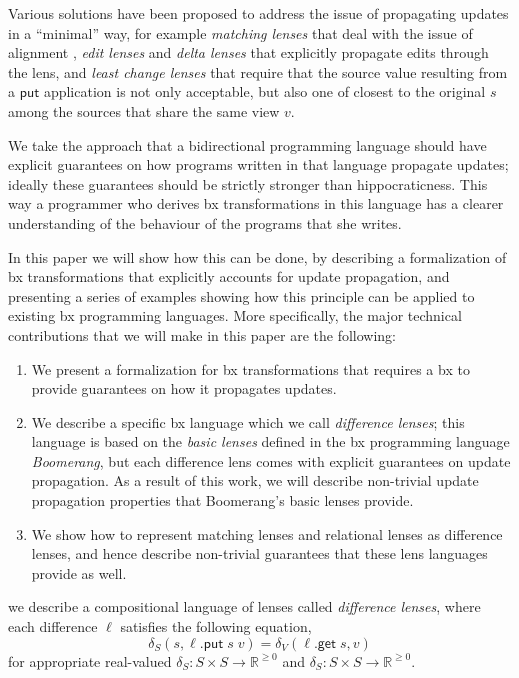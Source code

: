 \documentclass[acmsmall,review,anonymous]{acmart}\settopmatter{printfolios=true,printccs=false,printacmref=false}
\theoremstyle{definition}
\newcommand{\kw}[1]{\ensuremath{\mathsf{#1}}\xspace}
\newcommand{\get}{\ensuremath{\kw{get}}\xspace}
\newcommand{\pput}{\ensuremath{\kw{put}}\xspace}
\begin{document}
Various solutions have been proposed to address the issue of propagating updates in a ``minimal'' way, for example {\em matching lenses} that deal with the issue of alignment \cite{barbosa2010matching}, {\em edit lenses} \cite{hofmann2012edit} and {\em delta lenses} \cite{diskin2011asymmetric,diskin2011state,pacheco2012delta}
that explicitly propagate edits through the lens, and {\em least change
lenses} \cite{macedo2013composing} that require that the source value resulting from a \pput application is not only acceptable, but also one of closest to the original $s$ among the sources that share the same view $v$.

We take the approach that a bidirectional programming language should have explicit guarantees on how programs written in that language propagate updates; ideally these guarantees should be strictly stronger than hippocraticness. This way a programmer who derives bx transformations in this language has a clearer understanding of the behaviour of the programs that she writes. 

In this paper we will show how this can be done, by describing a formalization of bx transformations that explicitly accounts for update propagation, and presenting a series of examples showing how this principle can be applied to existing bx programming languages. More specifically, the major technical contributions that we will make in this paper are the following:
\begin{enumerate}
\item
We present a formalization for bx transformations that requires a bx to provide guarantees on how it propagates updates. 
\item
We describe a specific bx language which we call {\em difference lenses}; this language is based on the {\em basic lenses} defined in the bx programming language {\em Boomerang}\cite{foster2009bidirectional}, but each difference lens comes with explicit guarantees on update propagation. As a result of this work, we will describe non-trivial update propagation properties that Boomerang's basic lenses provide.
  \item
  We show how to represent matching lenses and  relational lenses \cite{bohannon2006relational} as difference lenses, and hence describe non-trivial guarantees that these lens languages provide as well.
\end{enumerate}
\iffalse
 we describe a compositional language of lenses called {\em difference lenses}, where each difference $\ell$ satisfies the following equation,
\begin{equation}\label{difflenslaw}
\delta_S(s, \ell.\pput \; s \; v) = \delta_V(\ell.\get \; s, v)
\end{equation}
for appropriate real-valued $\delta_S : S \times S \longrightarrow \mathbb{R}^{\geq 0}$ and $\delta_S : S \times S \longrightarrow \mathbb{R}^{\geq 0}$.
\end{document}
